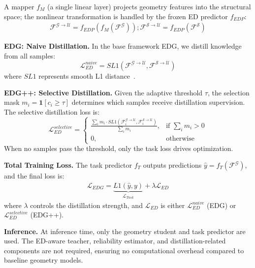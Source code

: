 A mapper $f_M$ (a single linear layer) projects geometry features into the structural space; the nonlinear transformation is handled by the frozen ED predictor $f_{EDP}$:
\begin{align}
\label{Formula_ED_features}
\mathcal{F}^{\mathcal{G}\rightarrow\mathcal{U}}=f_{EDP}(f_M(\mathcal{F}^{\mathcal{G}})); \mathcal{F}^{\mathcal{S}\rightarrow\mathcal{U}}=f_{EDP}(\mathcal{F}^{\mathcal{S}})
\end{align}

\textbf{EDG: Naive Distillation.} In the base framework EDG, we distill knowledge from all samples:
\begin{equation}
    \mathcal{L}_{ED}^{naive} = SL1(\mathcal{F}^{\mathcal{G}\rightarrow\mathcal{U}}, \mathcal{F}^{\mathcal{S}\rightarrow\mathcal{U}})
\end{equation}
where $SL1$ represents smooth L1 distance~\cite{girshick2015fast}.

\textbf{EDG++: Selective Distillation.} Given the adaptive threshold $\tau$, the selection mask $m_i = \mathbf{1}[c_i \geq \tau]$ determines which samples receive distillation supervision. The selective distillation loss is:
\begin{equation}
    \mathcal{L}_{ED}^{selective} = \begin{cases} \frac{\sum_{i} m_i \cdot SL1(\mathcal{F}^{\mathcal{G}\rightarrow\mathcal{U}}_i, \mathcal{F}^{\mathcal{S}\rightarrow\mathcal{U}}_i)}{\sum_i m_i}, & \text{if } \sum_i m_i > 0 \\ 0, & \text{otherwise} \end{cases}
\end{equation}
When no samples pass the threshold, only the task loss drives optimization.

\textbf{Total Training Loss.} The task predictor $f_T$ outputs predictions $\hat{y}=f_T(\mathcal{F}^{\mathcal{G}})$, and the final loss is:
\begin{align}
\label{Formula_L_EDG}
\mathcal{L}_{EDG}=\underbrace{L1(\hat{y}, y)}_{\mathcal{L}_{Task}}+\lambda\mathcal{L}_{ED}
\end{align}
where $\lambda$ controls the distillation strength, and $\mathcal{L}_{ED}$ is either $\mathcal{L}_{ED}^{naive}$ (EDG) or $\mathcal{L}_{ED}^{selective}$ (EDG++).

\textbf{Inference.} At inference time, only the geometry student and task predictor are used. The ED-aware teacher, reliability estimator, and distillation-related components are not required, ensuring no computational overhead compared to baseline geometry models.
